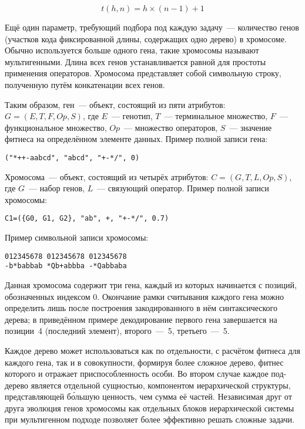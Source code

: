 \begin{equation}
\label{eq:GEP_tail_size}
t(h,n) = h \times (n -1) + 1
\end{equation}

Ещё один параметр, требующий подбора под каждую задачу~--- количество генов (участков кода фиксированной длины, содержащих одно дерево) в хромосоме. Обычно используется больше одного гена, такие хромосомы называют мультигенными. Длина всех генов устанавливается равной для простоты применения операторов. Хромосома представляет собой символьную строку, полученную путём конкатенации всех генов.

Таким образом, ген~--- объект, состоящий из пяти атрибутов: $G = (E, T, F, Op, S)$, где $E$~--- генотип, $T$~--- терминальное множество, $F$~--- функциональное множество, $Op$~--- множество операторов, $S$~--- значение фитнеса на определённом элементе данных. Пример полной записи гена:

\begin{verbatim}
("*++-aabcd", "abcd", "+-*/", 0)
\end{verbatim}

Хромосома~--- объект, состоящий из четырёх атрибутов: $C = (G, T, L, Op, S)$, где $G$~--- набор генов, $L$~--- связующий оператор. Пример полной записи хромосомы:

\begin{verbatim}
C1=({G0, G1, G2}, "ab", +, "+-*/", 0.7)
\end{verbatim}

Пример символьной записи хромосомы:

\begin{samepage}
\begin{verbatim}
012345678 012345678 012345678
-b*babbab *Qb+abbba -*Qabbaba
\end{verbatim}
\end{samepage}

Данная хромосома содержит три гена, каждый из которых начинается с позиций, обозначенных индексом 0. Окончание рамки считывания каждого гена можно определить лишь после построения закодированного в нём синтаксического дерева; в приведённом примере декодирование первого гена завершается на позиции~4 (последний элемент), второго~---~5, третьего~---~5.

Каждое дерево может использоваться как по отдельности, с расчётом фитнеса для каждого гена, так и в совокупности, формируя более сложное дерево, фитнес которого и отражает приспособленность особи. Во втором случае каждое под-дерево является отдельной сущностью, компонентом иерархической структуры, представляющей б\'{о}льшую ценность, чем сумма её частей. Независимая друг от друга эволюция генов хромосомы как отдельных блоков иерархической системы при мультигенном подходе позволяет более эффективно решать сложные задачи.

